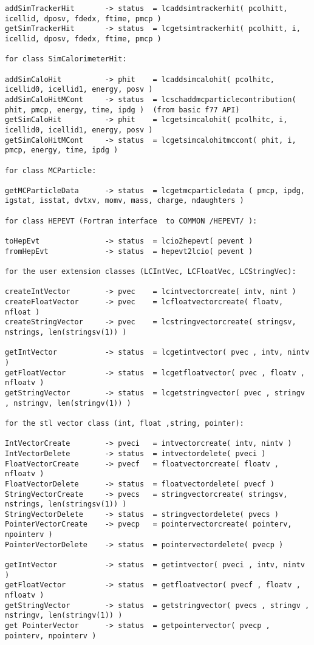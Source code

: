 \begin{scriptsize}
\begin{verbatim}
addSimTrackerHit       -> status  = lcaddsimtrackerhit( pcolhitt, icellid, dposv, fdedx, ftime, pmcp )
getSimTrackerHit       -> status  = lcgetsimtrackerhit( pcolhitt, i, icellid, dposv, fdedx, ftime, pmcp )

for class SimCalorimeterHit:

addSimCaloHit          -> phit    = lcaddsimcalohit( pcolhitc, icellid0, icellid1, energy, posv )
addSimCaloHitMCont     -> status  = lcschaddmcparticlecontribution( phit, pmcp, energy, time, ipdg )  (from basic f77 API)
getSimCaloHit          -> phit    = lcgetsimcalohit( pcolhitc, i, icellid0, icellid1, energy, posv )
getSimCaloHitMCont     -> status  = lcgetsimcalohitmccont( phit, i, pmcp, energy, time, ipdg )

for class MCParticle:

getMCParticleData      -> status  = lcgetmcparticledata ( pmcp, ipdg, igstat, isstat, dvtxv, momv, mass, charge, ndaughters )

for class HEPEVT (Fortran interface  to COMMON /HEPEVT/ ):

toHepEvt               -> status  = lcio2hepevt( pevent )
fromHepEvt             -> status  = hepevt2lcio( pevent )

for the user extension classes (LCIntVec, LCFloatVec, LCStringVec):

createIntVector        -> pvec    = lcintvectorcreate( intv, nint )
createFloatVector      -> pvec    = lcfloatvectorcreate( floatv, nfloat )
createStringVector     -> pvec    = lcstringvectorcreate( stringsv, nstrings, len(stringsv(1)) )

getIntVector           -> status  = lcgetintvector( pvec , intv, nintv )
getFloatVector         -> status  = lcgetfloatvector( pvec , floatv , nfloatv )
getStringVector        -> status  = lcgetstringvector( pvec , stringv , nstringv, len(stringv(1)) )

for the stl vector class (int, float ,string, pointer):

IntVectorCreate        -> pveci   = intvectorcreate( intv, nintv )
IntVectorDelete        -> status  = intvectordelete( pveci )
FloatVectorCreate      -> pvecf   = floatvectorcreate( floatv , nfloatv )
FloatVectorDelete      -> status  = floatvectordelete( pvecf )
StringVectorCreate     -> pvecs   = stringvectorcreate( stringsv, nstrings, len(stringsv(1)) )
StringVectorDelete     -> status  = stringvectordelete( pvecs )
PointerVectorCreate    -> pvecp   = pointervectorcreate( pointerv, npointerv )
PointerVectorDelete    -> status  = pointervectordelete( pvecp )

getIntVector           -> status  = getintvector( pveci , intv, nintv )
getFloatVector         -> status  = getfloatvector( pvecf , floatv , nfloatv )
getStringVector        -> status  = getstringvector( pvecs , stringv , nstringv, len(stringv(1)) )
get PointerVector      -> status  = getpointervector( pvecp , pointerv, npointerv )
\end{verbatim}

\end{scriptsize}


